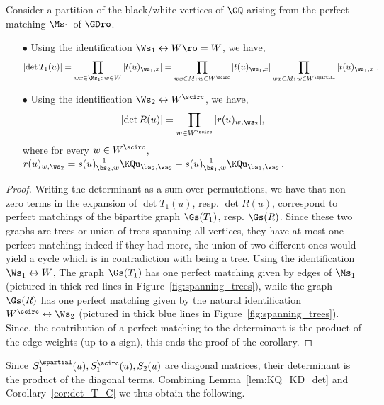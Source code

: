 \documentclass[a4paper,twoside,11pt]{article}
\begin{document}
\begin{cor}\label{cor:det_T_C}
Consider a partition of the black/white vertices of $\GQ$ arising from the perfect matching $\Ms_1$ of $\GDro$. 
\begin{itemize}
\item[$\bullet$] Using the identification $\Ws_1\leftrightarrow W\ro=W$, we have,
\begin{equation*}
\left|\det T_1(u)\right|=\prod_{wx\in \Ms_1:\,w\in W} |t(u)_{\ws_1,x}|
=\prod_{wx\in M:\,w\in W^\scirc} |t(u)_{\ws_1,x}|\prod_{wx\in M:\,w\in W^\spartial} |t(u)_{\ws_1,x}|.
\end{equation*}
\item[$\bullet$] Using the identification $\Ws_2\leftrightarrow W^\scirc$, we have,
\begin{equation*}
\left|\det R(u)\right|=\prod_{w\in W^\scirc}|r(u)_{w,\ws_2}|,
\end{equation*}
where for every $w\in W^\scirc$, $r(u)_{w,\ws_2}=s(u)_{\bs_2,w}^{-1}\KQu_{\bs_2,\ws_2}-s(u)_{\bs_1,w}^{-1}\KQu_{\bs_1,\ws_2}$.
\end{itemize}
\end{cor}
\begin{proof}
Writing the determinant as a sum over permutations, we have that non-zero terms in the expansion of $\det T_1(u)$, resp.
$\det R(u)$, correspond to perfect matchings of the bipartite graph $\Gs(T_1)$, resp. $\Gs(R)$. Since these two graphs
are trees or union of trees spanning all vertices, they have at most one perfect matching; indeed if they had more, the union of two
different ones would yield a cycle which is in contradiction with being a tree. 
Using the identification $\Ws_1\leftrightarrow W$, The graph $\Gs(T_1)$ has one perfect matching given by edges of $\Ms_1$ (pictured
in thick red lines in Figure~\ref{fig:spanning_trees}), while the graph $\Gs(R)$ has one perfect matching given by the natural identification
$W^\scirc\leftrightarrow \Ws_2$ (pictured in thick blue lines in Figure~\ref{fig:spanning_trees}). Since, the contribution of  
a perfect matching to the determinant is the product of the edge-weights (up to a sign), this ends the proof of the corollary.
\end{proof}

Since $S_1^\spartial(u),S_1^\scirc(u),S_2(u)$ are diagonal matrices, their determinant is the product of the diagonal terms. 
Combining Lemma~\ref{lem:KQ_KD_det} and Corollary~\ref{cor:det_T_C} we thus obtain the following.
\end{document}
